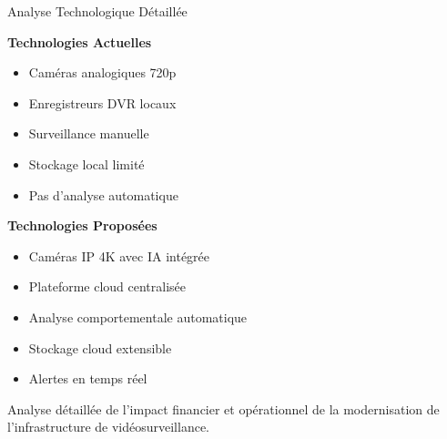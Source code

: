 \documentclass{dollarama}
\begin{document}
\begin{dollaramacomparison}{Analyse Technologique Détaillée}

\textbf{Technologies Actuelles}
\begin{itemize}
    \item Caméras analogiques 720p
    \item Enregistreurs DVR locaux
    \item Surveillance manuelle
    \item Stockage local limité
    \item Pas d'analyse automatique
\end{itemize}

\vscompare

\textbf{Technologies Proposées}
\begin{itemize}
    \item Caméras IP 4K avec IA intégrée
    \item Plateforme cloud centralisée
    \item Analyse comportementale automatique
    \item Stockage cloud extensible
    \item Alertes en temps réel
\end{itemize}

\end{dollaramacomparison}


\clearpage



\begin{dollaramafinancials}{
    Analyse détaillée de l'impact financier et opérationnel de la modernisation de l'infrastructure de vidéosurveillance.
}
\end{dollaramafinancials}
\end{document}
